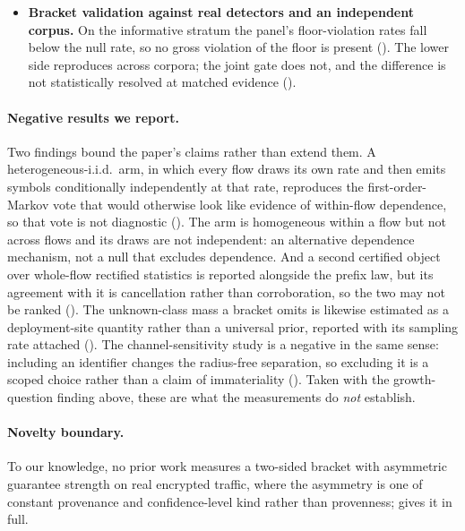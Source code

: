 \begin{itemize}
  standard chain-rule estimator cannot adjudicate whether divergence grows
  sublinearly here: its bias manufactures the effect it is meant to detect, and
  the failure is robust to two independent repairs at a quantified data cost
  ().
  \item \textbf{Bracket validation against real detectors and an independent
  corpus.} On the informative stratum the panel's floor-violation rates fall
  below the null rate, so no gross violation of the floor is present
  (). The lower side reproduces across
  corpora; the joint gate does not, and the difference is not statistically
  resolved at matched evidence ().
\end{itemize}

\paragraph{Negative results we report.} Two findings bound the paper's claims rather than extend them. A heterogeneous-i.i.d.\ arm, in which every flow draws its own
rate and then emits symbols conditionally independently at that rate, reproduces
the first-order-Markov vote that would otherwise look like evidence of
within-flow dependence, so that vote is not diagnostic
(). The arm is homogeneous within a flow but not across flows and its draws are not
independent: an alternative dependence mechanism, not a null that excludes
dependence. And a second
certified object
over whole-flow rectified statistics is reported alongside the prefix law, but
its agreement with it is cancellation rather than corroboration, so the two may
not be ranked (). The unknown-class mass a bracket
omits is likewise estimated as a deployment-site quantity rather than a
universal prior, reported with its sampling rate attached
(). The channel-sensitivity
study is a negative in the same sense: including an identifier changes the
radius-free separation, so excluding it is a scoped choice rather than a claim of
immateriality (). Taken with the growth-question
finding above, these are what the measurements do \emph{not} establish.

\paragraph{Novelty boundary.} To our knowledge, no prior work measures a
two-sided bracket with asymmetric guarantee strength on real encrypted traffic,
where the asymmetry is one of constant provenance and confidence-level kind
rather than provenness;  gives it in full.

